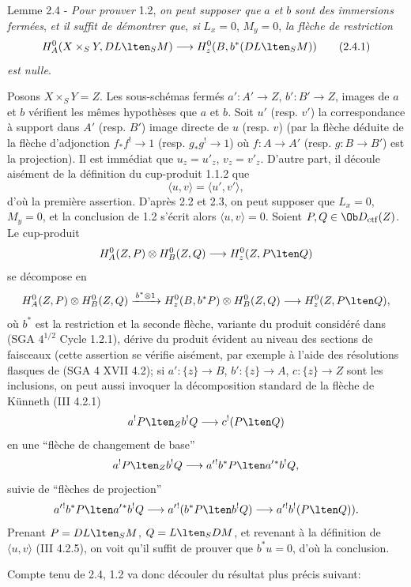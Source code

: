 \begin{statement}{Lemme 2.4 -}
\emph{Pour prouver} 1.2, \emph{on peut supposer que} $a$ \emph{et} $b$ \emph{sont des immersions fermées}, \emph{et il suffit de démontrer que}, \emph{si} $L_x=0$, $M_y=0$, \emph{la flèche de restriction}
\begin{equation}
H_A^0(X\times_SY,DL\lten_SM)
 \longrightarrow H_z^0(B,b^*(DL\lten_SM))
\tag{2.4.1}
\end{equation}
\emph{est nulle}.
\end{statement}

Posons $X\times_SY=Z$. Les sous-schémas fermés $a':A'\to Z$, $b':B'\to Z$, images de $a$ et $b$ vérifient les mêmes hypothèses que $a$ et $b$. Soit $u'$ (resp. $v'$) la correspondance à support dans $A'$ (resp. $B'$) image directe de $u$ (resp. $v$) (par la flèche déduite de la flèche d'adjonction $f_*f^!\to 1$ (resp. $g_*g^!\to 1$) où $f:A\to A'$ (resp. $g:B\to B'$) est la projection). Il est immédiat que $u_z=u'_z$, $v_z=v'_z$. D'autre part, il découle aisément de la définition du cup-produit 1.1.2 que
\[
\langle u,v\rangle=\langle u',v'\rangle,
\]
d'où la première assertion. D'après 2.2 et 2.3, on peut supposer que $L_x=0$, $M_y=0$, et la conclusion de 1.2 s'écrit alors $\langle u,v\rangle=0$. Soient $P,Q\in\Ob D_{\mathrm{ctf}}(Z)$. Le cup-produit
\[
H_A^0(Z,P)\otimes H_B^0(Z,Q)\longrightarrow H_z^0(Z,P\lten Q)
\]
se décompose en
\[
H_A^0(Z,P)\otimes H_B^0(Z,Q)
 \xrightarrow{\,b^*\otimes 1\,}
H_z^0(B,b^*P)\otimes H_B^0(Z,Q)
 \longrightarrow H_z^0(Z,P\lten Q),
\]
où $b^*$ est la restriction et la seconde flèche, variante du produit considéré dans (SGA $4^{1/2}$ Cycle 1.2.1), dérive du produit évident au niveau des sections de faisceaux (cette assertion se vérifie aisément, par exemple à l'aide des résolutions flasques de (SGA 4 XVII 4.2); si $a':\{z\}\to B$, $b':\{z\}\to A$, $c:\{z\}\to Z$ sont les inclusions, on peut aussi invoquer la décomposition standard de la flèche de Künneth (III 4.2.1)
\[
a^!P\lten_Z b^!Q\longrightarrow c^!(P\lten Q)
\]
en une ``flèche de changement de base''
\[
a^!P\lten_Z b^!Q\longrightarrow a'{}^!b^*P\lten a'{}^*b^!Q,
\]
suivie de ``flèches de projection''
\[
a'{}^!b^*P\lten a'{}^*b^!Q
 \longrightarrow a'{}^!(b^*P\lten b^!Q)
 \longrightarrow a'{}^!b^!(P\lten Q)).
\]
Prenant $P=DL\lten_SM$, $Q=L\lten_SDM$, et revenant à la définition de $\langle u,v\rangle$ (III 4.2.5), on voit qu'il suffit de prouver que $b^*u=0$, d'où la conclusion.

Compte
tenu de 2.4, 1.2 va donc découler du résultat plus précis suivant:

